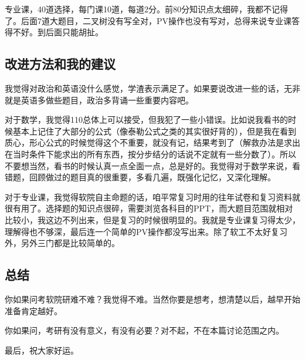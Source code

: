 专业课，40道选择，每门课10道，每道2分。前80分知识点太细碎，我都不记得了。后面7道大题目，二叉树没有写全对，PV操作也没有写对，总得来说专业课答得不好。到后面只能胡扯。

 

\subsection{改进方法和我的建议}

我觉得对政治和英语没什么感觉，学渣表示满足了。如果要说改进一些的话，无非就是英语多做些题目，政治多背诵一些重要内容吧。\par

对于数学，我觉得110总体上可以接受，但我犯了一些小错误。比如说我看书的时候基本上记住了大部分的公式（像泰勒公式之类的其实很好背的），但是我在看到质心，形心公式的时候觉得这个不重要，就没有记，结果考到了（解救办法是求出在当时条件下能求出的所有东西，按分步结分的话说不定就有一些分数了）。所以不要想当然，看书的时候认真一点全面一点，总是好的。我觉得对于数学来说，看错题，回顾做过的题目真的很重要，多看几遍，既强化记忆，又深化理解。\par

对于专业课，我觉得软院自主命题的话，咱平常复习时用的往年试卷和复习资料就很有用了。选择题的知识点很碎，需要浏览各科目的PPT，而大题目范围就相对比较小，我这边不列出来，但是复习的时候很明显的。我就是专业课复习得太少，理解得也不够深，最后连一个简单的PV操作都没写出来。除了软工不太好复习外，另外三门都是比较简单的。\par

 

\subsection{总结}

你如果问考软院研难不难？我觉得不难。当然你要是想考，想清楚以后，越早开始准备肯定越好。\par

你如果问，考研有没有意义，有没有必要？对不起，不在本篇讨论范围之内。\par

 

最后，祝大家好运。
